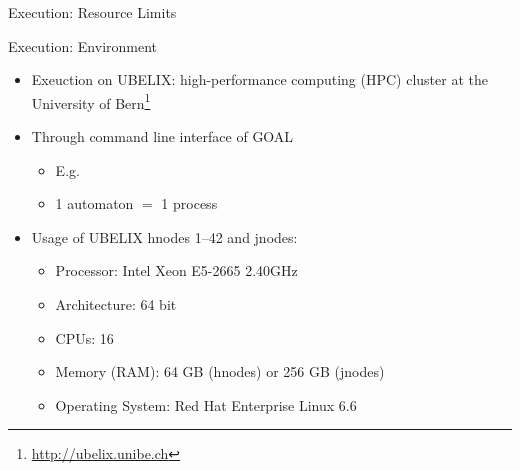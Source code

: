 \documentclass[12pt]{beamer}
\begin{document}
\begin{frame}{Execution: Resource Limits}
\end{frame}


\begin{frame}{Execution: Environment}
\vspace{3mm}
\begin{itemize}\itemsep6pt
\item Exeuction on UBELIX: high-performance computing (HPC) cluster at the University of Bern\footnote{\url{http://ubelix.unibe.ch}}
\pause
\item Through command line interface of GOAL
  \begin{itemize}\itemsep1pt
  \item E.g. \texttt{\color{blue}{gc complement -m fribourg 00001.gff}}
  \item 1 automaton $=$ 1 process
  \end{itemize}
\pause
\item Usage of UBELIX hnodes 1--42 and jnodes:
  \begin{itemize}\itemsep1pt
  \item Processor:        \tabto{3.25cm} Intel Xeon E5-2665 2.40GHz
  \item Architecture:     \tabto{3.25cm} 64 bit
  \item CPUs:             \tabto{3.25cm} 16
  \item Memory (RAM):     \tabto{3.25cm} 64 GB (hnodes) or 256 GB (jnodes)
  \item Operating System: \tabto{3.25cm} Red Hat Enterprise Linux 6.6
  \end{itemize}
\end{itemize}

\end{frame}
\end{document}
